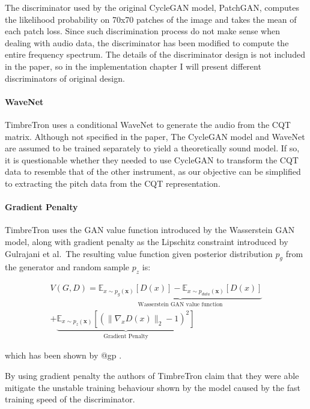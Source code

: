\documentclass[]{report}
\begin{document}
The discriminator used by the original CycleGAN model, PatchGAN,
computes the likelihood probability on 70x70 patches of the image and
takes the mean of each patch loss. Since such discrimination process do
not make sense when dealing with audio data, the discriminator has been
modified to compute the entire frequency spectrum. The details of the
discriminator design is not included in the paper, so in the
implementation chapter I will present different discriminators of
original design.

\paragraph{WaveNet}

TimbreTron uses a conditional WaveNet to generate the audio from the CQT
matrix. Although not specified in the paper, The CycleGAN model and
WaveNet are assumed to be trained separately to yield a theoretically
sound model. If so, it is questionable whether they needed to use
CycleGAN to transform the CQT data to resemble that of the other
instrument, as our objective can be simplified to extracting the pitch
data from the CQT representation.

\paragraph{Gradient Penalty}

TimbreTron uses the GAN value function introduced by the Wasserstein GAN
model, along with gradient penalty as the Lipschitz constraint
introduced by Gulrajani et al.~The resulting value function given
posterior distribution \(p_g\) from the generator and random sample
\(p_z\) is:

\begin{multline}
    V(G, D) = \underbrace{
        \mathbb{E}_{x \sim p_{g}(\mathbf{x})} [D(x)] - \mathbb{E}_{x \sim p_{data}(\mathbf{x})} [D(x)]
        }_\textrm{Wasserstein GAN value function} \\ +
        \underbrace{
            \mathbb{E}_{x \sim p_z(\mathbf{x})} [(\| \nabla_x D(x) \|_2 - 1)^2]
        }_\textrm{Gradient Penalty} 
\end{multline}

which has been shown by @gp .

By using gradient penalty the authors of TimbreTron claim that they were
able mitigate the unstable training behaviour shown by the model caused
by the fast training speed of the discriminator.
\end{document}
